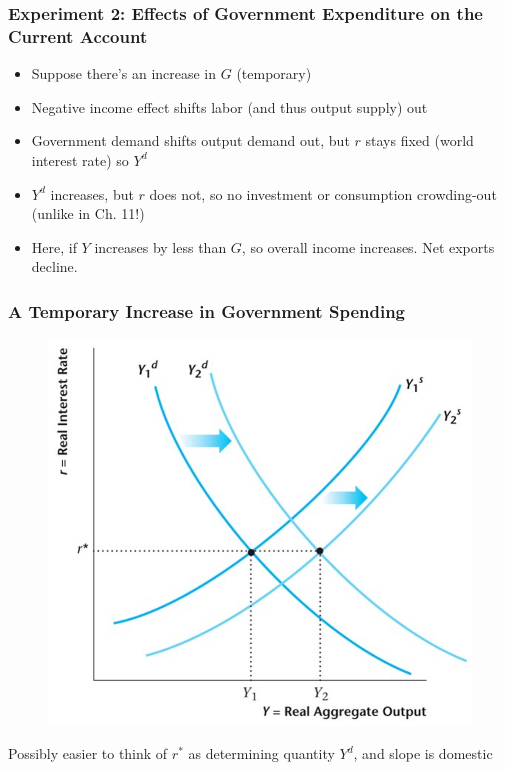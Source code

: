 \documentclass{beamer}
\begin{document}
\begin{frame}
\frametitle[alignment=center]{Experiment 2: Effects of Government Expenditure on the Current Account}
\begin{itemize}
\item Suppose there's an increase in $G$ (temporary)
\bigskip
\item Negative income effect shifts labor (and thus output supply) out
\bigskip
\item Government demand shifts output demand out, but $r$ stays fixed (world interest rate) so $Y^d$  
\bigskip
\item $Y^d$ increases, but $r$ does not, so no investment or consumption crowding-out  (unlike in Ch. 11!)
\bigskip
\item Here, if $Y$ increases by less than $G$, so overall income increases.  Net exports decline.
\end{itemize}
\end{frame}

\begin{frame}
\frametitle[alignment=center]{A Temporary Increase in Government Spending}
\begin{figure}
\centering
\includegraphics[scale=0.55]{Figures/W_Fig_16pt9.png}
\end{figure}
Possibly easier to think of $r^*$ as determining quantity $Y^d$, and slope is domestic
\end{frame}
\end{document}
